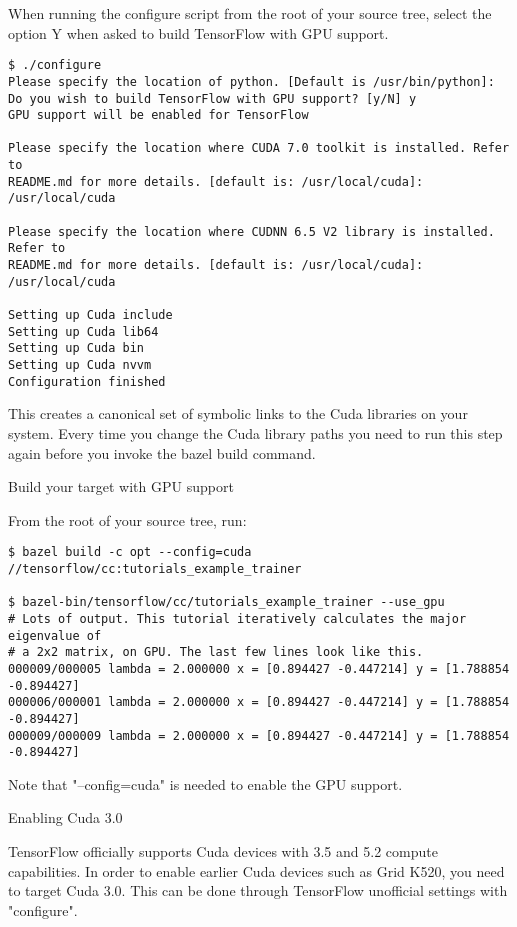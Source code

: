When running the configure script from the root of your source tree, select the option Y when asked to build TensorFlow with GPU support.

\begin{lstlisting}
$ ./configure
Please specify the location of python. [Default is /usr/bin/python]:
Do you wish to build TensorFlow with GPU support? [y/N] y
GPU support will be enabled for TensorFlow

Please specify the location where CUDA 7.0 toolkit is installed. Refer to
README.md for more details. [default is: /usr/local/cuda]: /usr/local/cuda

Please specify the location where CUDNN 6.5 V2 library is installed. Refer to
README.md for more details. [default is: /usr/local/cuda]: /usr/local/cuda

Setting up Cuda include
Setting up Cuda lib64
Setting up Cuda bin
Setting up Cuda nvvm
Configuration finished
\end{lstlisting}

This creates a canonical set of symbolic links to the Cuda libraries on your system. Every time you change the Cuda library paths you need to run this step again before you invoke the bazel build command.

Build your target with GPU support

From the root of your source tree, run:

\begin{lstlisting}
$ bazel build -c opt --config=cuda //tensorflow/cc:tutorials_example_trainer

$ bazel-bin/tensorflow/cc/tutorials_example_trainer --use_gpu
# Lots of output. This tutorial iteratively calculates the major eigenvalue of
# a 2x2 matrix, on GPU. The last few lines look like this.
000009/000005 lambda = 2.000000 x = [0.894427 -0.447214] y = [1.788854 -0.894427]
000006/000001 lambda = 2.000000 x = [0.894427 -0.447214] y = [1.788854 -0.894427]
000009/000009 lambda = 2.000000 x = [0.894427 -0.447214] y = [1.788854 -0.894427]
\end{lstlisting}

Note that "--config=cuda" is needed to enable the GPU support.

Enabling Cuda 3.0

TensorFlow officially supports Cuda devices with 3.5 and 5.2 compute capabilities. In order to enable earlier Cuda devices such as Grid K520, you need to target Cuda 3.0. This can be done through TensorFlow unofficial settings with "configure".

